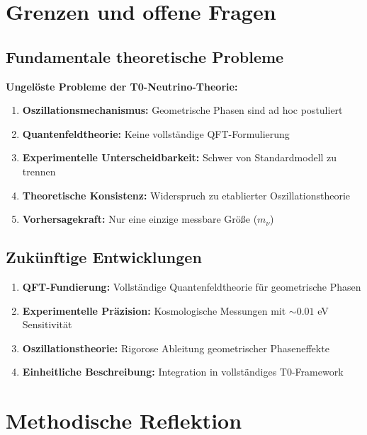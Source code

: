 \documentclass[12pt,a4paper]{article}
\begin{document}
	\section{Grenzen und offene Fragen}
	
	\subsection{Fundamentale theoretische Probleme}
	
	\begin{warning}
		\textbf{Ungelöste Probleme der T0-Neutrino-Theorie:}
		
		\begin{enumerate}
			\item \textbf{Oszillationsmechanismus:} Geometrische Phasen sind ad hoc postuliert
			\item \textbf{Quantenfeldtheorie:} Keine vollständige QFT-Formulierung
			\item \textbf{Experimentelle Unterscheidbarkeit:} Schwer von Standardmodell zu trennen
			\item \textbf{Theoretische Konsistenz:} Widerspruch zu etablierter Oszillationstheorie
			\item \textbf{Vorhersagekraft:} Nur eine einzige messbare Größe ($m_\nu$)
		\end{enumerate}
	\end{warning}
	
	\subsection{Zukünftige Entwicklungen}
	
	\begin{enumerate}
		\item \textbf{QFT-Fundierung:} Vollständige Quantenfeldtheorie für geometrische Phasen
		\item \textbf{Experimentelle Präzision:} Kosmologische Messungen mit $\sim 0.01$ eV Sensitivität
		\item \textbf{Oszillationstheorie:} Rigorose Ableitung geometrischer Phaseneffekte
		\item \textbf{Einheitliche Beschreibung:} Integration in vollständiges T0-Framework
	\end{enumerate}
	
	\section{Methodische Reflektion}
	
\end{document}
